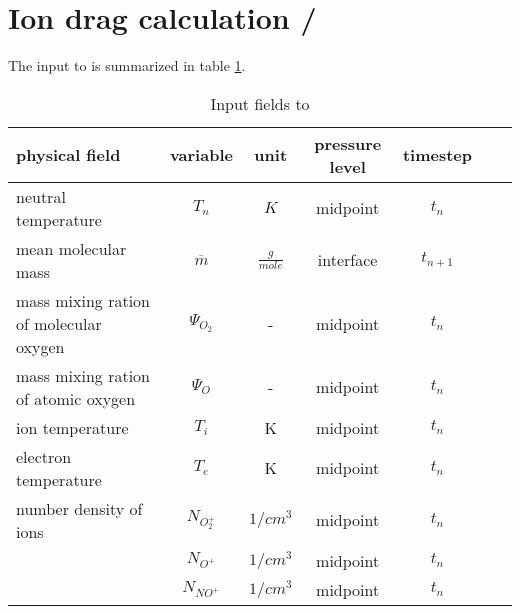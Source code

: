 %
\section{Ion drag calculation / }\label{cap:lamdas}
%
The input to  is summarized in table
\ref{tab:input_lamdas}.
%
\begin{table}[tb]
\begin{tabular}{|p{3.5cm} ||c|c|c|c|c|c|} \hline
physical field               & variable        & unit&pressure
level& timestep
\\ \hline \hline
%
neutral temperature         & $T_n$           & $K$   & midpoint  & $t_n$\\
mean molecular mass         & $\overline{m}$  & $\frac{g}{mole}$ &interface & $t_{n+1}$ \\
mass mixing ration of molecular oxygen             & $\Psi_{O_2}$        & -  & midpoint & $t_n$\\
mass mixing ration of atomic oxygen                & $\Psi_{O}$          & -  & midpoint & $t_n$\\
ion temperature              & $T_i$        & K  & midpoint & $t_n$\\
electron temperature         & $T_e$        & K  & midpoint & $t_n$\\
number density of ions       &  $N_{O_2^+}$      & $1/cm^3$  & midpoint & $t_n$\\
  {}       &  $N_{O^+}$      & $1/cm^3$  & midpoint & $t_n$\\
 {}        &  $N_{NO^+}$     & $1/cm^3$  & midpoint & $t_n$
 \\ \hline
\end{tabular}
\caption{Input fields to }
\label{tab:input_lamdas}
\end{table}


